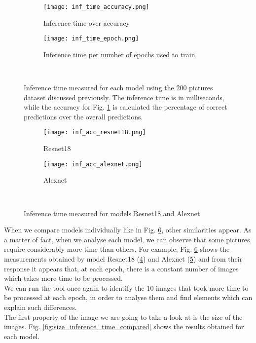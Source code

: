 \begin{figure}[h]
     \begin{subfigure}{0.5\textwidth}
	    \texttt{[image: inf\_time\_accuracy.png]}
	    \caption{Inference time over accuracy}
         \label{fig:inf_time_accuracy}
     \end{subfigure}
     \hfill
     \begin{subfigure}{0.5\textwidth}
	    \texttt{[image: inf\_time\_epoch.png]}
	    \caption{Inference time per number of epochs used to train}
        \label{fig:inf_time_epoch}
     \end{subfigure}\\
     \caption[Inference time measured for each model]{Inference time measured for each model using the 200 pictures dataset discussed previously. The inference time is in milliseconds, while the accuracy for Fig. \ref{fig:inf_time_accuracy} is calculated the percentage of correct predictions over the overall predictions.}
        \label{fig:inf_time_epoch_c}
\end{figure}

\begin{figure}[h]
     \begin{subfigure}{0.5\textwidth}
	    \texttt{[image: inf\_acc\_resnet18.png]}
	    \caption{Resnet18}
         \label{fig:inf_acc_resnet18}
         
     \end{subfigure}
     \hfill
     \begin{subfigure}{0.5\textwidth}
	    \texttt{[image: inf\_acc\_alexnet.png]}
	    \caption{Alexnet}
        \label{fig:inf_acc_alexnet}
        
     \end{subfigure}\\
     \caption{Inference time measured for models Resnet18 and Alexnet}
        \label{fig:inf_acc_c}
\end{figure}
When we compare models individually like in Fig. \ref{fig:inf_acc_c}, other similarities appear. As a matter of fact, when we analyse each model, we can observe that some pictures require considerably more time than others. For example, Fig. \ref{fig:inf_acc_c} shows the measurements obtained by model Resnet18 (\ref{fig:inf_acc_resnet18}) and Alexnet (\ref{fig:inf_acc_alexnet}) and from their response it appears that, at each epoch, there is a constant number of images which takes more time to be processed. \\
We can run the tool once again to identify the 10 images that took more time to be processed at each epoch, in order to analyse them and find elements which can explain such differences. \\
The first property of the image we are going to take a look at is the size of the images. Fig. \ref{fig:size_inference_time_compared} shows the results obtained for each model. 



